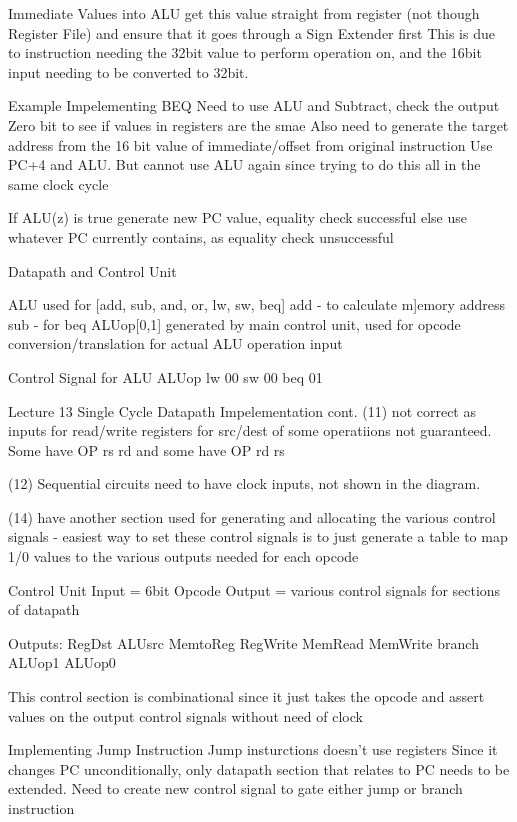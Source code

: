 \documentclass{article}
\begin{document}
		Immediate Values into ALU
			get this value straight from register (not though Register File) and ensure that it goes through a Sign Extender first
			This is due to instruction needing the 32bit value to perform operation on, and the 16bit input needing to be converted to 32bit.


	Example
		Impelementing BEQ
			Need to use ALU and Subtract, check the output Zero bit to see if values in registers are the smae
			Also need to generate the target address from the 16 bit value of immediate/offset from original instruction
				Use PC+4 and ALU. But cannot use ALU again since trying to do this all in the same clock cycle

			If ALU(z) is true
				generate new PC value, equality check successful
			else
				use whatever PC currently contains, as equality check unsuccessful

	Datapath and Control Unit

		ALU used for [add, sub, and, or, lw, sw, beq]
		add - to calculate m]emory address
		sub - for beq
		ALUop[0,1] generated by main control unit, used for opcode conversion/translation for actual ALU operation input

	Control Signal for ALU
			ALUop	
		lw	00
		sw	00
		beq	01
		
Lecture 13
	Single Cycle Datapath Impelementation cont.
		(11) not correct as inputs for read/write registers for src/dest of some operatiions not guaranteed. Some have OP rs rd and some have OP rd rs

		(12) Sequential circuits need to have clock inputs, not shown in the diagram.

		(14) have another section used for generating and allocating the various control signals
		- easiest way to set these control signals is to just generate a table to map 1/0 values to the various outputs needed for each opcode

		Control Unit
			Input = 6bit Opcode
			Output = various control signals for sections of datapath

			Outputs:
				RegDst
				ALUsrc
				MemtoReg
				RegWrite
				MemRead
				MemWrite
				branch
				ALUop1
				ALUop0

			This control section is combinational since it just takes the opcode and assert values on the output control signals without need of clock

		Implementing Jump Instruction
			Jump insturctions doesn't use registers
			Since it changes PC unconditionally, only datapath section that relates to PC needs to be extended. 
			Need to create new control signal to gate either jump or branch instruction
\end{document}

